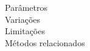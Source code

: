 \begin{description}
\item[Parâmetros]
\item[Variações]
\item[Limitações]
\item[Métodos relacionados]
\end{description}
%
%
%
%
%
%
